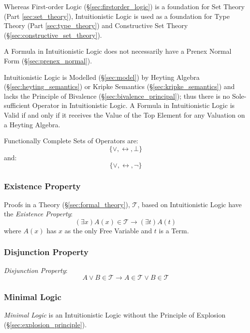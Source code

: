 Whereas First-order Logic (\S\ref{sec:firstorder_logic}) is a
foundation for Set Theory (Part \ref{sec:set_theory}), Intuitionistic
Logic is used as a foundation for Type Theory (Part
\ref{sec:type_theory}) and Constructive Set Theory
(\S\ref{sec:constructive_set_theory}).

A Formula in Intuitionistic Logic does not necessarily have a Prenex
Normal Form (\S\ref{sec:prenex_normal}).

Intuitionistic Logic is Modelled (\S\ref{sec:model}) by Heyting
Algebra (\S\ref{sec:heyting_semantics}) or Kripke Semantics
(\S\ref{sec:kripke_semantics}) and lacks the Principle of Bivalence
(\S\ref{sec:bivalence_principal}); thus there is no Sole-sufficient
Operator in Intuitionistic Logic. A Formula in Intuitionistic Logic is
Valid if and only if it receives the Value of the Top Element for any
Valuation on a Heyting Algebra.

Functionally Complete Sets of Operators are:
\[
    \{ \vee, \leftrightarrow, \bot \}
\]
and:
\[
    \{ \vee, \leftrightarrow, \neg \}
\]



\subsubsection{Existence Property}\label{sec:existence_property}

Proofs in a Theory (\S\ref{sec:formal_theory}), $\mathcal{T}$, based
on Intuitionistic Logic have the \emph{Existence Property}:
\[
    (\exists x)A(x) \in \mathcal{T} \rightarrow (\exists t)A(t)
\]
where $A(x)$ has $x$ as the only Free Variable and $t$ is a Term.



\subsubsection{Disjunction Property}\label{sec:disjunction_property}

\emph{Disjunction Property}:
\[
    A \vee B \in \mathcal{T} \rightarrow A \in \mathcal{T} \vee B \in \mathcal{T}
\]



\subsubsection{Minimal Logic}

\emph{Minimal Logic} is an Intuitionistic Logic without the Principle
of Explosion (\S\ref{sec:explosion_principle}).



